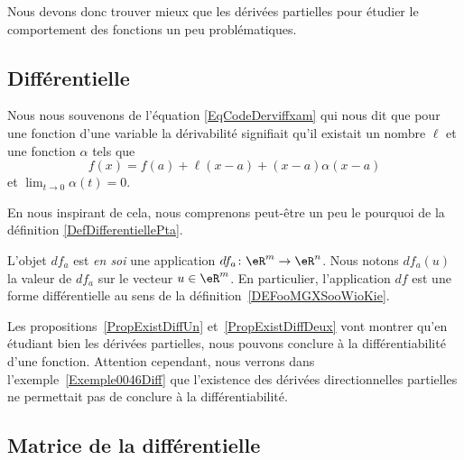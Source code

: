 Nous devons donc trouver mieux que les dérivées partielles pour étudier le comportement des fonctions un peu problématiques.

\subsection{Différentielle}

Nous nous souvenons de l'équation \eqref{EqCodeDerviffxam} qui nous dit que pour une fonction d'une variable la dérivabilité signifiait qu'il existait un nombre $\ell$ et une fonction $\alpha$ tels que
\begin{equation}
    f(x)=f(a)+\ell(x-a)+(x-a)\alpha(x-a)
\end{equation}
et $\lim_{t\to 0} \alpha(t)=0$.

En nous inspirant de cela, nous comprenons peut-être un peu le pourquoi de la définition \ref{DefDifferentiellePta}.

\begin{normaltext}
    L'objet $df_a$ est \emph{en soi} une application $df_a\colon \eR^m\to \eR^n$. Nous notons $df_a(u)$ la valeur de $df_a$ sur le vecteur $u\in\eR^m$. En particulier, l'application \( df\) est une forme différentielle au sens de la définition~\ref{DEFooMGXSooWioKie}.
\end{normaltext}

\begin{normaltext}
    Les propositions~\ref{PropExistDiffUn} et~\ref{PropExistDiffDeux} vont montrer qu'en étudiant bien les dérivées partielles, nous pouvons conclure à la différentiabilité d'une fonction.
    Attention cependant, nous verrons dans l'exemple~\ref{Exemple0046Diff} que l'existence des dérivées directionnelles partielles ne permettait pas de conclure à la différentiabilité.
\end{normaltext}

\subsection{Matrice de la différentielle}

